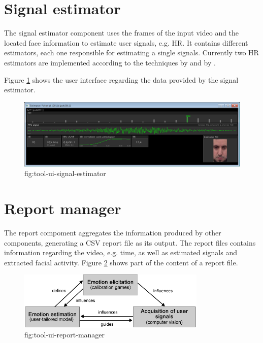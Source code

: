 \section{Signal estimator}

The signal estimator component uses the frames of the input video and the located face information to estimate user signals, e.g. HR. It contains different estimators, each one responsible for estimating a single signals. Currently two HR estimators are implemented according to the techniques by \textcite{poh2010non} and by \textcite{poh2011advancements}.

Figure \ref{fig:tool-ui-signal-estimator} shows the user interface regarding the data provided by the signal estimator.

\begin{figure}[h]
    \centering
    \includegraphics[width=\textwidth]{figures/tool-ui-signal-estimator.png}
    \caption{fig:tool-ui-signal-estimator}
    \label{fig:tool-ui-signal-estimator}
\end{figure}

\section{Report manager}

The report compoment aggregates the information produced by other components, generating a CSV report file as its output. The report files contains information regarding the video, e.g. time, as well as estimated signals and extracted facial activity. Figure \ref{fig:tool-ui-report-manager} shows part of the content of a report file.

\begin{figure}[h]
    \centering
    \includegraphics[width=0.8\textwidth]{figures/method-components-dependency.png}
    \caption{fig:tool-ui-report-manager}
    \label{fig:tool-ui-report-manager}
\end{figure}

